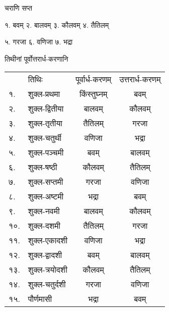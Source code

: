 {चराणि सप्त}

१. बवम् \hspace{2ex} २. बालवम् \hspace{2ex} ३. कौलवम् \hspace{2ex} ४. तैतिलम्

५. गरजा \hspace{2ex} ६. वणिजा  \hspace{2ex}७. भद्रा 

\clearpage

{तिथीनां पूर्वोत्तरार्ध-करणानि}

\begin{tabular}{llcc}
  & तिथिः & पूर्वार्ध-करणम् & उत्तरार्ध-करणम्\\
१. & शुक्ल-प्रथमा & किंस्तुघ्नम् & बवम्\\
२. & शुक्ल-द्वितीया & बालवम् & कौलवम्\\
३. & शुक्ल-तृतीया & तैतिलम् & गरजा\\
४. & शुक्ल-चतुर्थी & वणिजा & भद्रा\\
५. & शुक्ल-पञ्चमी & बवम् & बालवम्\\
६. & शुक्ल-षष्ठी & कौलवम् & तैतिलम्\\
७. & शुक्ल-सप्तमी & गरजा & वणिजा\\
८. & शुक्ल-अष्टमी & भद्रा & बवम्\\
९. & शुक्ल-नवमी & बालवम् & कौलवम्\\
१०.& शुक्ल-दशमी & तैतिलम् & गरजा\\
११.& शुक्ल-एकादशी & वणिजा & भद्रा\\
१२.& शुक्ल-द्वादशी & बवम् & बालवम्\\
१३.& शुक्ल-त्रयोदशी & कौलवम् & तैतिलम्\\
१४.& शुक्ल-चतुर्दशी & गरजा & वणिजा\\
१५.& पौर्णमासी & भद्रा & बवम्\\
\end{tabular}

